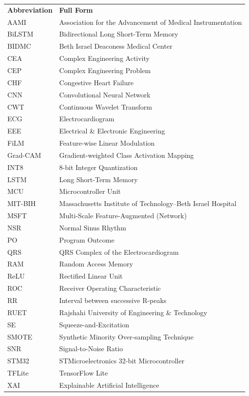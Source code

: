%


\begin{longtable}{@{}p{1.5in}@{\hspace{0.3in}}p{3.5in}@{}}
\textbf{Abbreviation} & \textbf{Full Form} \\[6pt]
AAMI   & Association for the Advancement of Medical Instrumentation \\
BiLSTM & Bidirectional Long Short-Term Memory \\
BIDMC  & Beth Israel Deaconess Medical Center \\
CEA    & Complex Engineering Activity \\
CEP    & Complex Engineering Problem \\
CHF    & Congestive Heart Failure \\
CNN    & Convolutional Neural Network \\
CWT    & Continuous Wavelet Transform \\
ECG    & Electrocardiogram \\
EEE    & Electrical \& Electronic Engineering \\
FiLM   & Feature-wise Linear Modulation \\
Grad-CAM & Gradient-weighted Class Activation Mapping \\
INT8   & 8-bit Integer Quantization \\
LSTM   & Long Short-Term Memory \\
MCU    & Microcontroller Unit \\
MIT-BIH & Massachusetts Institute of Technology--Beth Israel Hospital \\
MSFT   & Multi-Scale Feature-Augmented (Network) \\
NSR    & Normal Sinus Rhythm \\
PO     & Program Outcome \\
QRS    & QRS Complex of the Electrocardiogram \\
RAM    & Random Access Memory \\
ReLU   & Rectified Linear Unit \\
ROC    & Receiver Operating Characteristic \\
RR     & Interval between successive R-peaks \\
RUET   & Rajshahi University of Engineering \& Technology \\
SE     & Squeeze-and-Excitation \\
SMOTE  & Synthetic Minority Over-sampling Technique \\
SNR    & Signal-to-Noise Ratio \\
STM32  & STMicroelectronics 32-bit Microcontroller \\
TFLite & TensorFlow Lite \\
XAI    & Explainable Artificial Intelligence \\
\end{longtable}

\clearpage